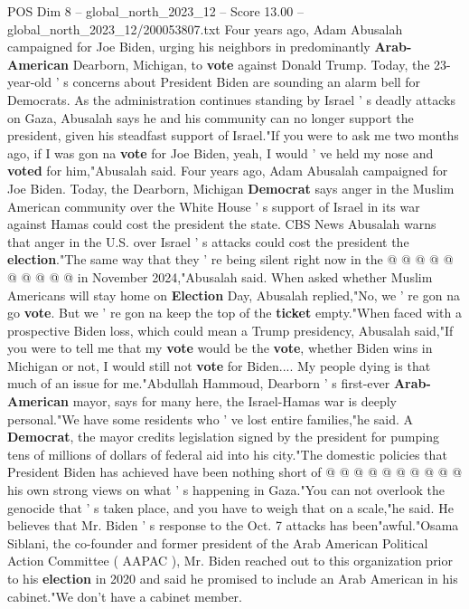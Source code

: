 \begin{textsample}{POS Dim 8 – global\_north\_2023\_12 – Score 13.00 – global\_north\_2023\_12/200053807.txt}  \label{ex:f8_pos_111}
Four years ago, Adam Abusalah campaigned for Joe Biden, urging his neighbors in predominantly \textbf{Arab-American} Dearborn, Michigan, to \textbf{vote} against Donald Trump.
Today, the 23-year-old ' s concerns about President Biden are sounding an alarm bell for Democrats.
As the administration continues standing by Israel ' s deadly attacks on Gaza, Abusalah says he and his community can no longer support the president, given his steadfast support of Israel."If you were to ask me two months ago, if I was gon na \textbf{vote} for Joe Biden, yeah, I would ' ve held my nose and \textbf{voted} for him,"Abusalah said.
Four years ago, Adam Abusalah campaigned for Joe Biden.
Today, the Dearborn, Michigan \textbf{Democrat} says anger in the Muslim American community over the White House ' s support of Israel in its war against Hamas could cost the president the state.
CBS News Abusalah warns that anger in the U.S. over Israel ' s attacks could cost the president the \textbf{election}."The same way that they ' re being silent right now in the @ @ @ @ @ @ @ @ @ @ in November 2024,"Abusalah said.
When asked whether Muslim Americans will stay home on \textbf{Election} Day, Abusalah replied,"No, we ' re gon na go \textbf{vote}.
But we ' re gon na keep the top of the \textbf{ticket} empty."When faced with a prospective Biden loss, which could mean a Trump presidency, Abusalah said,"If you were to tell me that my \textbf{vote} would be the \textbf{vote}, whether Biden wins in Michigan or not, I would still not \textbf{vote} for Biden....
My people dying is that much of an issue for me."Abdullah Hammoud, Dearborn ' s first-ever \textbf{Arab-American} mayor, says for many here, the Israel-Hamas war is deeply personal."We have some residents who ' ve lost entire families,"he said.
A \textbf{Democrat}, the mayor credits legislation signed by the president for pumping tens of millions of dollars of federal aid into his city."The domestic policies that President Biden has achieved have been nothing short of @ @ @ @ @ @ @ @ @ @ his own strong views on what ' s happening in Gaza."You can not overlook the genocide that ' s taken place, and you have to weigh that on a scale,"he said.
He believes that Mr.
Biden ' s response to the Oct. 7 attacks has been"awful."Osama Siblani, the co-founder and former president of the Arab American Political Action Committee ( AAPAC ), Mr.
Biden reached out to this organization prior to his \textbf{election} in 2020 and said he promised to include an Arab American in his cabinet."We don't have a cabinet member.

\end{textsample}
